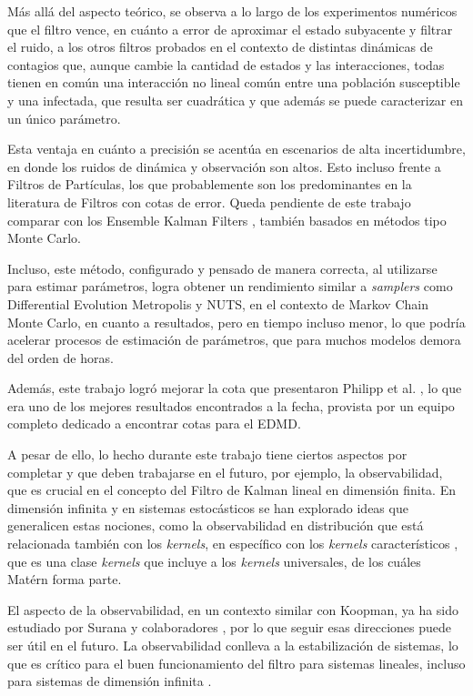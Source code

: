 Más allá del aspecto teórico, se observa a lo largo de los experimentos numéricos que el filtro vence, en cuánto a error de aproximar el estado subyacente y filtrar el ruido, a los otros filtros probados en el contexto de distintas dinámicas de contagios que, aunque cambie la cantidad de estados y las interacciones, todas tienen en común una interacción no lineal común entre una población susceptible y una infectada, que resulta ser cuadrática y que además se puede caracterizar en un único parámetro.

Esta ventaja en cuánto a precisión se acentúa en escenarios de alta incertidumbre, en donde los ruidos de dinámica y observación son altos. Esto incluso frente a Filtros de Partículas, los que probablemente son los predominantes en la literatura de Filtros con cotas de error. Queda pendiente de este trabajo comparar con los Ensemble Kalman Filters \cite{Evensen1994SequentialStatistics}, también basados en métodos tipo Monte Carlo.

Incluso, este método, configurado y pensado de manera correcta, al utilizarse para estimar parámetros, logra obtener un rendimiento similar a \textit{samplers} como Differential Evolution Metropolis y NUTS, en el contexto de Markov Chain Monte Carlo, en cuanto a resultados, pero en tiempo incluso menor, lo que podría acelerar procesos de estimación de parámetros, que para muchos modelos demora del orden de horas.

Además, este trabajo logró mejorar la cota que presentaron Philipp et al. \cite{Philipp2024ErrorOperator}, lo que era uno de los mejores resultados encontrados a la fecha, provista por un equipo completo dedicado a encontrar cotas para el EDMD.

A pesar de ello, lo hecho durante este trabajo tiene ciertos aspectos por completar y que deben trabajarse en el futuro, por ejemplo, la observabilidad, que es crucial en el concepto del Filtro de Kalman lineal en dimensión finita. En dimensión infinita y en sistemas estocásticos se han explorado ideas que generalicen estas nociones, como la observabilidad en distribución \cite{Massiani2024Data-DrivenSystems} que está relacionada también con los \textit{kernels}, en específico con los \textit{kernels} característicos \cite{Sriperumbudur2010OnMeasures, Sriperumbudur2011UniversalityMeasures}, que es una clase \textit{kernels} que incluye a los \textit{kernels} universales, de los cuáles Matérn forma parte.

El aspecto de la observabilidad, en un contexto similar con Koopman, ya ha sido estudiado por Surana y colaboradores \cite{Surana2016LinearFramework}, por lo que seguir esas direcciones puede ser útil en el futuro. La observabilidad conlleva a la estabilización de sistemas, lo que es crítico para el buen funcionamiento del filtro para sistemas lineales, incluso para sistemas de dimensión infinita \cite{Afshar2024ExtendedSystems}.

